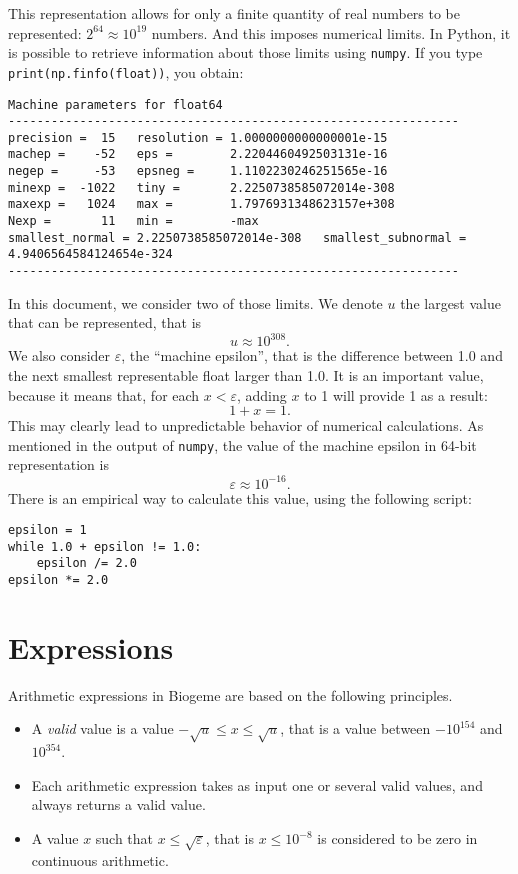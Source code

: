 \documentclass[12pt,a4paper]{article}
\begin{document}
This representation allows for only a finite quantity of real numbers to be represented: $2^{64} \approx 10^{19}$ numbers. And this imposes numerical limits. In Python, it is possible to retrieve information about those limits using \lstinline+numpy+. If you type \lstinline+print(np.finfo(float))+, you obtain:
\begin{lstlisting}
Machine parameters for float64
---------------------------------------------------------------
precision =  15   resolution = 1.0000000000000001e-15
machep =    -52   eps =        2.2204460492503131e-16
negep =     -53   epsneg =     1.1102230246251565e-16
minexp =  -1022   tiny =       2.2250738585072014e-308
maxexp =   1024   max =        1.7976931348623157e+308
Nexp =       11   min =        -max
smallest_normal = 2.2250738585072014e-308   smallest_subnormal = 4.9406564584124654e-324
---------------------------------------------------------------  
\end{lstlisting}

In this document, we consider two of those limits. We denote $u$ the largest value that can be represented, that is
\[
u \approx 10^{308}.
\]
We also consider $\varepsilon$, the ``machine epsilon'', that is the difference between 1.0 and the next smallest representable float larger than 1.0. It is an important value, because it means that, for each $x < \varepsilon$, adding $x$ to 1 will provide 1 as a result:
\[
1 + x = 1.
\]
This may clearly lead to unpredictable behavior of numerical calculations. As mentioned in the output of \lstinline+numpy+, the value of the machine epsilon in 64-bit representation is
\[
\varepsilon \approx 10^{-16}.
\]
There is an empirical way to calculate this value, using the following script:
\begin{lstlisting}
epsilon = 1
while 1.0 + epsilon != 1.0:
    epsilon /= 2.0
epsilon *= 2.0
\end{lstlisting}

\section{Expressions}

Arithmetic expressions in Biogeme are based on the following principles.
\begin{itemize}
\item A \emph{valid} value is a value $-\sqrt{u} \leq x \leq \sqrt{u}$, that is a value between $-10^{154}$ and $10^{354}$.
\item Each arithmetic expression takes as input one or several valid values, and always returns a valid value.
\item A value $x$ such that $x \leq \sqrt{\varepsilon}$, that is $x \leq 10^{-8}$ is considered to be zero in continuous arithmetic.  
\end{itemize}
\end{document}
